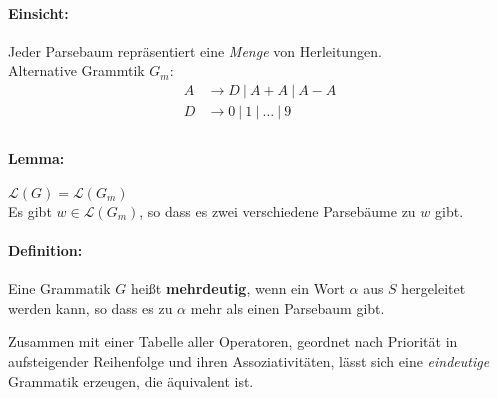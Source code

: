 \paragraph{Einsicht:} Jeder Parsebaum repräsentiert eine \textit{Menge} von Herleitungen.\\
Alternative Grammtik $G_m$:
\begin{align*}
 A &\to D\ |\ A+A\ |\ A-A \\
 D &\to 0\ |\ 1\ |\ \dots\ |\ 9 \\
\end{align*}
\paragraph{Lemma:} $\mathcal{L}(G) = \mathcal{L}(G_m)$\\
Es gibt $w \in \mathcal{L}(G_m)$, so dass es zwei verschiedene Parsebäume zu $w$ gibt.

\paragraph{Definition:} Eine Grammatik $G$ heißt \textbf{mehrdeutig}, wenn ein Wort $\alpha$ aus $S$ hergeleitet werden kann, so dass es zu $\alpha$ mehr als einen Parsebaum gibt.

Zusammen mit einer Tabelle aller Operatoren, geordnet nach Priorität in aufsteigender Reihenfolge und ihren Assoziativitäten, lässt sich eine \emph{eindeutige} Grammatik erzeugen, die äquivalent ist.

